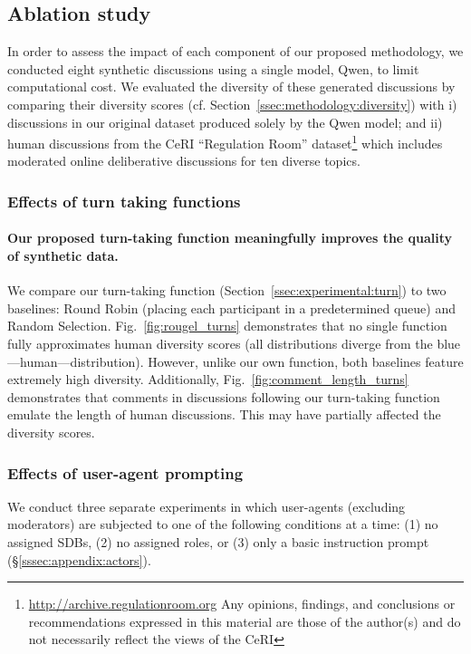 \subsection{Ablation study}
\label{ssec:results:ablation}

In order to assess the impact of each component of our proposed methodology, we conducted eight synthetic discussions using a single model, Qwen, to limit computational cost. We evaluated the diversity of these generated discussions by comparing their diversity scores (cf. Section~\ref{ssec:methodology:diversity}) with i) discussions in our original dataset produced solely by the Qwen model; and ii) human discussions from the \ac{CeRI} “Regulation Room” dataset\footnote{\url{http://archive.regulationroom.org} Any opinions, findings, and conclusions or recommendations expressed in this material are those of the author(s) and do not necessarily reflect the views of the \ac{CeRI}} which includes moderated online deliberative discussions for ten diverse topics.


\subsubsection{Effects of turn taking functions}

\paragraph{Our proposed turn-taking function meaningfully improves the quality of synthetic data.} We compare our turn-taking function (Section~\ref{ssec:experimental:turn}) to two baselines: Round Robin (placing each participant in a predetermined queue) and Random Selection. Fig.~\ref{fig:rougel_turns} demonstrates that no single function fully approximates human diversity scores (all distributions diverge from the blue—human—distribution). However, unlike our own function, both baselines feature extremely high diversity. Additionally, Fig.~\ref{fig:comment_length_turns} demonstrates that comments in discussions following our turn-taking function emulate the length of human discussions. This may have partially affected the diversity scores.


\subsubsection{Effects of user-agent prompting}

We conduct three separate experiments in which user-agents (excluding moderators) are subjected to one of the following conditions at a time: (1) no assigned \acp{SDB}, (2) no assigned roles, or (3) only a basic instruction prompt (\S\ref{sssec:appendix:actors}). 

